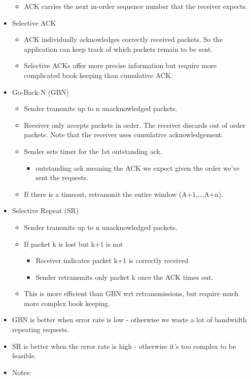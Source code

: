 \begin{itemize}
  \begin{itemize}
  \tightlist
  \item
    ACK carries the next in-order sequence number that the receiver
    expects.
  \end{itemize}
\item
  Selective ACK

  \begin{itemize}
  \tightlist
  \item
    ACK individually acknowledges correctly received packets. So the
    application can keep track of which packets remain to be sent.
  \item
    Selective ACKs offer more precise information but require more
    complicated book keeping than cumulative ACK.
  \end{itemize}
\item
  Go-Back-N (GBN)

  \begin{itemize}
  \tightlist
  \item
    Sender transmits up to n unacknowledged packets.
  \item
    Receiver only accepts packets in order. The receiver discards out of
    order packets. Note that the receiver uses cumulative
    acknowledgement.
  \item
    Sender sets timer for the 1st outstanding ack.

    \begin{itemize}
    \tightlist
    \item
      outstanding ack meaning the ACK we expect given the order we've
      sent the requests.
    \end{itemize}
  \item
    If there is a timeout, retransmit the entire window
    (A+1,\ldots{},A+n).
  \end{itemize}
\item
  Selective Repeat (SR)

  \begin{itemize}
  \tightlist
  \item
    Sender transmits up to n unacknowledged packets.
  \item
    If packet k is lost but k+1 is not

    \begin{itemize}
    \tightlist
    \item
      Receiver indicates packet k+1 is correctly received
    \item
      Sender retransmits only packet k once the ACK times out.
    \end{itemize}
  \item
    This is more efficient than GBN wrt retransmissions, but require
    much more complex book keeping.
  \end{itemize}
\item
  GBN is better when error rate is low - otherwise we waste a lot of
  bandwidth repeating requests.
\item
  SR is better when the error rate is high - otherwise it's too complex
  to be feasible.
\item
  Notes:


\end{itemize}
